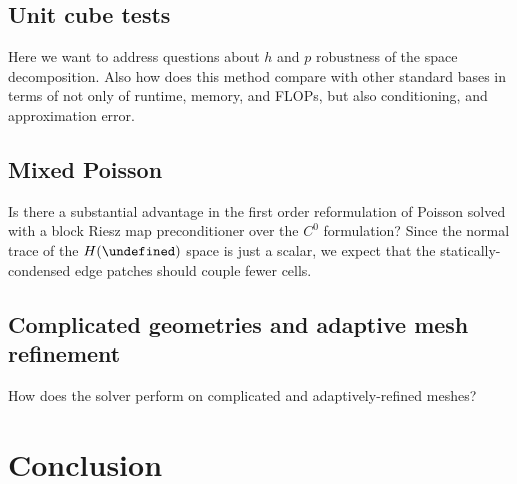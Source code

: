 \documentclass[review,onefignum,onetabnum,a4paper]{siamart190516}
\let\div\undefined
\DeclareMathOperator{\div}{div}
\newcommand{\Hdiv}{H(\div)}
\begin{document}
\subsection{Unit cube tests}
Here we want to address questions about $h$ and $p$ robustness of the space
decomposition. Also how does this method compare with other standard bases in
terms of not only of runtime, memory, and FLOPs, but also conditioning, and
approximation error.

\subsection{Mixed Poisson}
Is there a substantial advantage in the first order reformulation of Poisson solved
with a block Riesz map preconditioner over the $C^0$ formulation?
Since the normal trace of the $\Hdiv$ space is just a scalar, we expect that the
statically-condensed edge patches should couple fewer cells.


\subsection{Complicated geometries and adaptive mesh refinement}
How does the solver perform on complicated and adaptively-refined meshes?


\section{Conclusion} \label{sec:conclusion}





\end{document}
